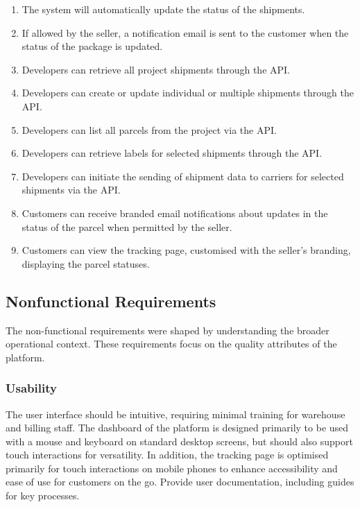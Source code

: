 \begin{enumerate}[label=\bfseries FR\arabic*:,leftmargin=*]
    \item The system will automatically update the status of the shipments.
    \item If allowed by the seller, a notification email is sent to the customer when the status of the package is updated.
    \item Developers can retrieve all \gls{project} shipments through the API.
    \item Developers can create or update individual or multiple shipments through the API.
    \item Developers can list all parcels from the \gls{project} via the API.
    \item Developers can retrieve labels for selected shipments through the API.
    \item Developers can initiate the sending of shipment data to carriers for selected shipments via the API.
    \item Customers can receive branded email notifications about updates in the status of the parcel when permitted by the \gls{seller}.
    \item Customers can view the tracking page, customised with the seller's branding, displaying the parcel statuses.
\end{enumerate}

\subsection{Nonfunctional Requirements}
\label{subsec:nonfunctional-requirements}
The non-functional requirements were shaped by understanding the broader operational context.
These requirements focus on the quality attributes of the platform.

\subsubsection{Usability}
The user interface should be intuitive, requiring minimal training for warehouse and billing staff.
The dashboard of the platform is designed primarily to be used with a mouse and keyboard on standard desktop screens, but should also support touch interactions for versatility.
In addition, the tracking page is optimised primarily for touch interactions on mobile phones to enhance accessibility and ease of use for customers on the go. 
Provide user documentation, including guides for key processes.


